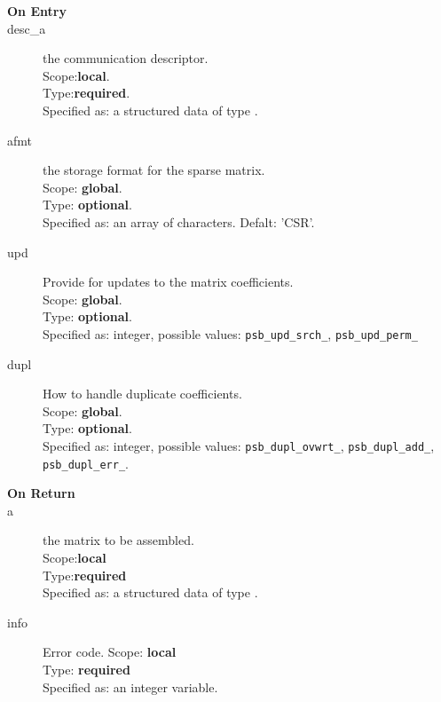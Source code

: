 \begin{description}
\item[\bf On Entry]
\item[desc\_a] the communication descriptor.\\
Scope:{\bf local}.\\
Type:{\bf required}.\\
Specified as: a structured data of type \descdata.
\item[afmt] the storage format for the sparse matrix.\\
Scope: {\bf global}.\\
Type: {\bf optional}.\\
Specified as: an array of characters. Defalt:  'CSR'.
\item[upd] Provide for updates to the matrix coefficients.\\
Scope: {\bf global}.\\
Type: {\bf optional}.\\
Specified as: integer, possible values: \verb|psb_upd_srch_|, \verb|psb_upd_perm_|
\item[dupl] How to handle duplicate coefficients.\\
Scope: {\bf global}.\\
Type: {\bf optional}.\\
Specified as: integer, possible values: \verb|psb_dupl_ovwrt_|,
\verb|psb_dupl_add_|, \verb|psb_dupl_err_|.
\end{description}

\begin{description}
\item[\bf On Return]
\item[a] the matrix to be assembled.\\
Scope:{\bf local}\\
Type:{\bf required}\\
Specified as: a structured data of type \spdata.
\item[info] Error code.
Scope: {\bf local} \\
Type: {\bf required}\\
Specified as: an integer variable.
\end{description}

